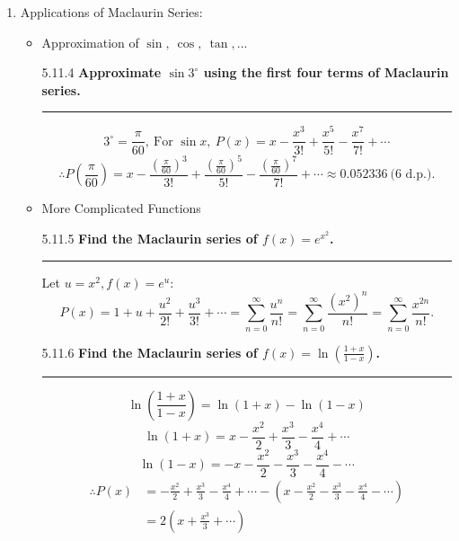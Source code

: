 \documentclass[12pt, a4paper]{article}
\begin{document}
\begin{enumerate}
\begin{example}{5.11.3}{}
            $$\therefore P(x)=\sum_{n=0}^\infty\frac{\sqrt{2}}{2}\binom{-\frac{1}{2}}{n}\left(1-\frac{x}{2}\right)^{-\frac{1}{2}}=\frac{\sqrt{2}}{2}\sum_{n=0}^\infty\binom{-\frac{1}{2}}{n}\left(1-\frac{x}{2}\right)^{-\frac{1}{2}}.$$
    \end{example}
    \item Applications of Maclaurin Series: 
    \begin{itemize}
        \item Approximation of $\sin,\ \cos,\ \tan,...$
        \begin{example}{5.11.4}{}
            \textbf{Approximate $\sin 3^\circ$ using the first four terms of Maclaurin series.}\\
            \noindent\rule[0.1pt]{\textwidth}{1pt}
            $$3^\circ=\frac{\pi}{60},\ \text{For }\sin x,\ P(x)=x-\frac{x^3}{3!}+\frac{x^5}{5!}-\frac{x^7}{7!}+\cdots$$
            $$\therefore P\left(\frac{\pi}{60}\right)=x-\frac{\left(\frac{\pi}{60}\right)^3}{3!}+\frac{\left(\frac{\pi}{60}\right)^5}{5!}-\frac{\left(\frac{\pi}{60}\right)^7}{7!}+\cdots\approx 0.052336\ \text{(6 d.p.)}.$$
        \end{example}
        \item More Complicated Functions
        \begin{example}{5.11.5}{}
            \textbf{Find the Maclaurin series of $f(x)=e^{x^2}$.}\\
            \noindent\rule[0.1pt]{\textwidth}{1pt}
            Let $u=x^2, f(x)=e^u$:
            $$P(x)=1+u+\frac{u^2}{2!}+\frac{u^3}{3!}+\cdots=\sum_{n=0}^\infty\frac{u^n}{n!}=\sum_{n=0}^\infty\frac{\left(x^2\right)^n}{n!}=\sum_{n=0}^\infty\frac{x^{2n}}{n!}.$$
        \end{example}
        \begin{example}{5.11.6}{}
            \textbf{Find the Maclaurin series of $f(x)=\ln\left(\frac{1+x}{1-x}\right)$.}\\
            \noindent\rule[0.1pt]{\textwidth}{1pt}
            $$\ln\left(\frac{1+x}{1-x}\right)=\ln(1+x)-\ln(1-x)$$
            $$\ln(1+x)=x-\frac{x^2}{2}+\frac{x^3}{3}-\frac{x^4}{4}+\cdots$$
            $$\ln(1-x)=-x-\frac{x^2}{2}-\frac{x^3}{3}-\frac{x^4}{4}-\cdots$$
            $$\begin{aligned}
                \therefore P(x)&=-\frac{x^2}{2}+\frac{x^3}{3}-\frac{x^4}{4}+\cdots-\left(x-\frac{x^2}{2}-\frac{x^3}{3}-\frac{x^4}{4}-\cdots\right)\\
                &=2(x+\frac{x^3}{3}+\cdots)\\

\end{aligned}$$
\end{example}
\end{itemize}
\end{enumerate}
\end{document}
